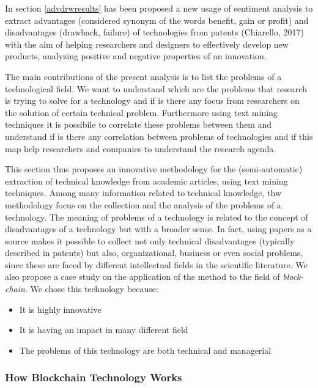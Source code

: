\documentclass[]{book}
\providecommand{\tightlist}{%
  \setlength{\itemsep}{0pt}\setlength{\parskip}{0pt}}
\begin{document}
In section \ref{advdrwresults} has been proposed a new usage of
sentiment analysis to extract advantages (considered synonym of the
words benefit, gain or profit) and disadvantages (drawback, failure) of
technologies from patents (Chiarello, 2017) with the aim of helping
researchers and designers to effectively develop new products, analyzing
positive and negative properties of an innovation.

The main contributions of the present analysis is to list the problems
of a technological field. We want to understand which are the problems
that research is trying to solve for a technology and if is there any
focus from researchers on the solution of certain technical problem.
Furthermore using text mining techniques it is possibile to correlate
these problems between them and understand if is there any correlation
between problems of technologies and if this map help researchers and
companies to understand the research agenda.

This section thus proposes an innovative methodology for the
(semi-automatic) extraction of technical knowledge from academic
articles, using text mining techniques. Among many information related
to technical knowledge, thw methodology focus on the collection and the
analysis of the problems of a technology. The meaning of problems of a
technology is related to the concept of disadvantages of a technology
but with a broader sense. In fact, using papers as a source makes it
possible to collect not only technical disadvantages (typically
described in patents) but also, organizational, business or even social
problems, since these are faced by different intellectual fields in the
scientific literature. We also propose a case study on the application
of the method to the field of \emph{block-chain}. We chose this
technology because:

\begin{itemize}
\tightlist
\item
  It is highly innovative
\item
  It is having an impact in many different field
\item
  The problems of this technology are both technical and managerial
\end{itemize}

\subsubsection*{How Blockchain Technology
Works}\label{how-blockchain-technology-works}
\end{document}
